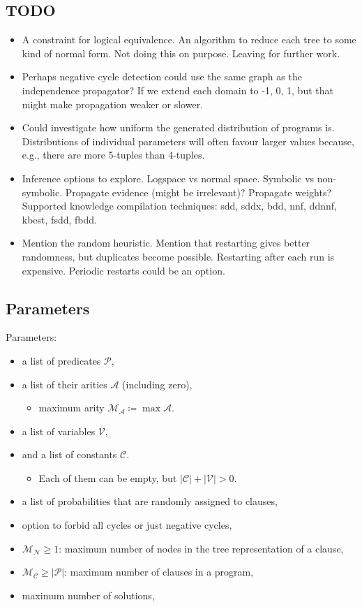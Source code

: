 \documentclass[runningheads]{llncs}
\newcommand{\predicates}{\mathcal{P}}
\newcommand{\variables}{\mathcal{V}}
\newcommand{\constants}{\mathcal{C}}
\newcommand{\arities}{\mathcal{A}}
\newcommand{\maxArity}{\mathcal{M}_{\mathcal{A}}}
\newcommand{\maxNumNodes}{\mathcal{M}_{\mathcal{N}}}
\newcommand{\maxNumClauses}{\mathcal{M}_{\mathcal{C}}}
\begin{document}
\subsection{TODO}

\begin{itemize}
\item A constraint for logical equivalence. An algorithm to reduce each tree to
  some kind of normal form. Not doing this on purpose. Leaving for further work.
\item Perhaps negative cycle detection could use the same graph as the
  independence propagator? If we extend each domain to {-1, 0, 1}, but that
  might make propagation weaker or slower.
\item Could investigate how uniform the generated distribution of programs is.
  Distributions of individual parameters will often favour larger values
  because, e.g., there are more 5-tuples than 4-tuples.
\item Inference options to explore. Logspace vs normal space. Symbolic vs
  non-symbolic. Propagate evidence (might be irrelevant)? Propagate weights?
  Supported knowledge compilation techniques: sdd, sddx, bdd, nnf, ddnnf, kbest,
  fsdd, fbdd.
\item Mention the random heuristic. Mention that restarting gives better
  randomness, but duplicates become possible. Restarting after each run is
  expensive. Periodic restarts could be an option.
\end{itemize}

\subsection{Parameters}

Parameters:
\begin{itemize}
\item a list of predicates $\predicates{}$,
\item a list of their arities $\arities{}$ (including zero),
  \begin{itemize}
  \item maximum arity $\maxArity{} \coloneqq \max \arities{}$.
  \end{itemize}
\item a list of variables $\variables{}$,
\item and a list of constants $\constants{}$.
  \begin{itemize}
  \item Each of them can be empty, but $|\constants{}| + |\variables{}| > 0$.
  \end{itemize}
\item a list of probabilities that are randomly assigned to clauses,
\item option to forbid all cycles or just negative cycles,
\item $\maxNumNodes{} \ge 1$: maximum number of nodes in the tree representation
  of a clause,
\item $\maxNumClauses{} \ge |\predicates{}|$: maximum number of clauses in a
  program,
\item maximum number of solutions,
\end{itemize}
\end{document}
